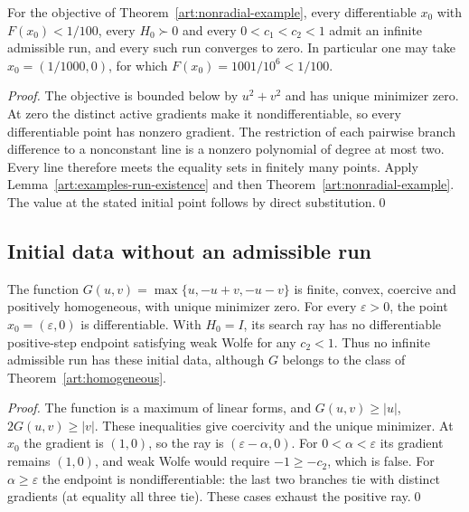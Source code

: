 \begin{corollary}\label{art:examples-nonradial-runs}
For the objective of Theorem~\ref{art:nonradial-example}, every differentiable
$x_0$ with $F(x_0)<1/100$, every $H_0\succ0$ and every $0<c_1<c_2<1$
admit an infinite admissible run, and every such run converges to zero.
In particular one may take $x_0=(1/1000,0)$, for which
$F(x_0)=1001/10^6<1/100$.
\end{corollary}
\begin{proof}
The objective is bounded below by $u^2+v^2$ and has unique minimizer zero.
At zero the distinct active gradients make it nondifferentiable, so every
differentiable point has nonzero gradient. The restriction of each pairwise
branch difference to a nonconstant line is a nonzero polynomial of degree
at most two. Every line therefore meets the equality sets in finitely many
points. Apply
Lemma~\ref{art:examples-run-existence} and then
Theorem~\ref{art:nonradial-example}. The value at the stated initial point
follows by direct substitution.\qed
\end{proof}

\subsection{Initial data without an admissible run}

\begin{proposition}\label{art:examples-no-step}
The function $G(u,v)=\max\{u,-u+v,-u-v\}$ is finite, convex, coercive and
positively homogeneous, with unique minimizer zero. For every $\varepsilon>0$,
the point $x_0=(\varepsilon,0)$ is differentiable. With $H_0=I$, its search
ray has no differentiable positive-step endpoint satisfying weak Wolfe for
any $c_2<1$. Thus no infinite admissible run has these initial data, although
$G$ belongs to the class of Theorem~\ref{art:homogeneous}.
\end{proposition}
\begin{proof}
The function is a maximum of linear forms, and
$G(u,v)\ge|u|$, $2G(u,v)\ge|v|$. These inequalities give coercivity and
the unique minimizer. At $x_0$ the gradient is $(1,0)$, so the ray is
$(\varepsilon-\alpha,0)$. For $0<\alpha<\varepsilon$ its gradient remains
$(1,0)$, and weak Wolfe would require $-1\ge-c_2$, which is false.
For $\alpha\ge\varepsilon$ the endpoint is nondifferentiable: the last
two branches tie with distinct gradients (at equality all three tie).
These cases exhaust the positive ray.\qed
\end{proof}
